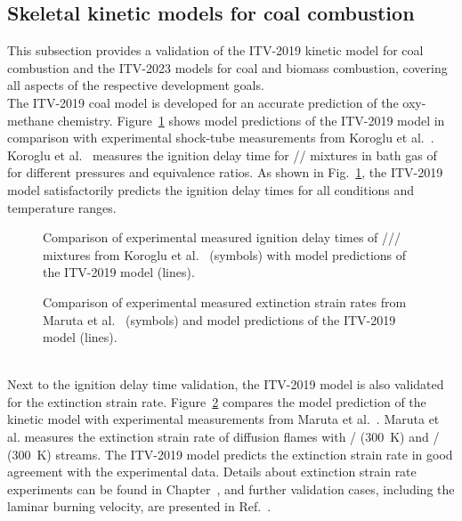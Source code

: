 \begin{refsection}
\subsection{Skeletal kinetic models for coal combustion}
This subsection provides a validation of the ITV-2019 kinetic model for coal combustion and the ITV-2023 models for coal and biomass combustion, covering all aspects of the respective development goals.
\\
The ITV-2019 coal model is developed for an accurate prediction of the oxy-methane chemistry. Figure~\ref{fig:B1bIDTLimingCaiCoalMechanism} shows model predictions of the ITV-2019 model in comparison with experimental shock-tube measurements from Koroglu et al.~\cite{Koroglu2016}. Koroglu et al.~\cite{Koroglu2016} measures the ignition delay time for // mixtures in bath gas of  for different pressures and equivalence ratios. As shown in Fig.~\ref{fig:B1bIDTLimingCaiCoalMechanism}, the ITV-2019 model satisfactorily predicts the ignition delay times for all conditions and temperature ranges.
\begin{figure}[h]
  \centering
  \hfill
  \hfill
  \caption{Comparison of experimental measured ignition delay times of /// mixtures from Koroglu et al.~\cite{Koroglu2016} (symbols) with model predictions of the ITV-2019 model (lines).}
  \label{fig:B1bIDTLimingCaiCoalMechanism}
\end{figure}
\begin{figure}[t]
  \centering
  \hfill
  \caption{Comparison of experimental measured extinction strain rates from Maruta et al.~\cite{Maruta2007} (symbols) and model predictions of the ITV-2019 model (lines).}
  \label{fig:B1bExtStrainRateLimingCaiCoalMechanism}
\end{figure}
\\
Next to the ignition delay time validation, the ITV-2019 model is also validated for the extinction strain rate. Figure~\ref{fig:B1bExtStrainRateLimingCaiCoalMechanism} compares the model prediction of the kinetic model with experimental measurements from Maruta et al.~\cite{Maruta2007}. Maruta et al.\cite{Maruta2007} measures the extinction strain rate of diffusion flames with / (\SI{300}{K}) and / (\SI{300}{K}) streams. The ITV-2019 model predicts the extinction strain rate in good agreement with the experimental data. Details about extinction strain rate experiments can be found in Chapter~, and further validation cases, including the laminar burning velocity, are presented in Ref.~\cite{Cai2020}.

\end{refsection}
